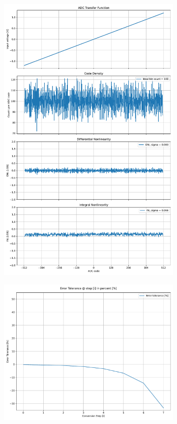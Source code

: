 \documentclass[varwidth]{standalone}
\begin{document}
\begin{figure}
\begin{subfigure}{0.32\textwidth}
    \includegraphics[width=\textwidth]{behavioral_10b_seterror_nonlinearity.pdf}
\end{subfigure}
\begin{subfigure}{0.32\textwidth}
    \includegraphics[width=\textwidth]{behavioral_10b_seterror_redundancy.pdf}

\end{subfigure}
\end{figure}
\end{document}

